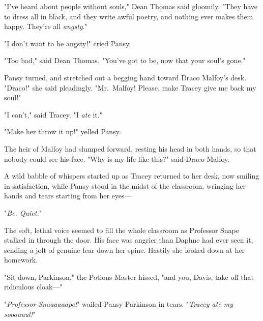 "I've heard about people without souls," Dean Thomas said gloomily. "They have
to dress all in black, and they write awful poetry, and nothing ever makes them
happy. They're all \emph{angsty}."

"I don't want to be angsty!" cried Pansy.

"Too bad," said Dean Thomas. "You've got to be, now that your soul's gone."

Pansy turned, and stretched out a begging hand toward Draco Malfoy's desk.
"Draco!" she said pleadingly. "Mr.~Malfoy! Please, make Tracey give me back my
soul!"

"I can't," said Tracey. "I \emph{ate} it."

"Make her throw it up!" yelled Pansy.

The heir of Malfoy had slumped forward, resting his head in both hands, so that
nobody could see his face. "Why is my life like this?" said Draco Malfoy.

A wild babble of whispers started up as Tracey returned to her desk, now
smiling in satisfaction, while Pansy stood in the midst of the classroom,
wringing her hands and tears starting from her eyes---

"\emph{Be. Quiet.}"

The soft, lethal voice seemed to fill the whole classroom as Professor Snape
stalked in through the door. His face was angrier than Daphne had ever seen it,
sending a jolt of genuine fear down her spine. Hastily she looked down at her
homework.

"Sit down, Parkinson," the Potions Master hissed, "and you, Davis, take off
that ridiculous cloak---"

"\emph{Professor Snaaaaaape!}" wailed Pansy Parkinson in tears. "\emph{Tracey
ate my sooouuul!}"
